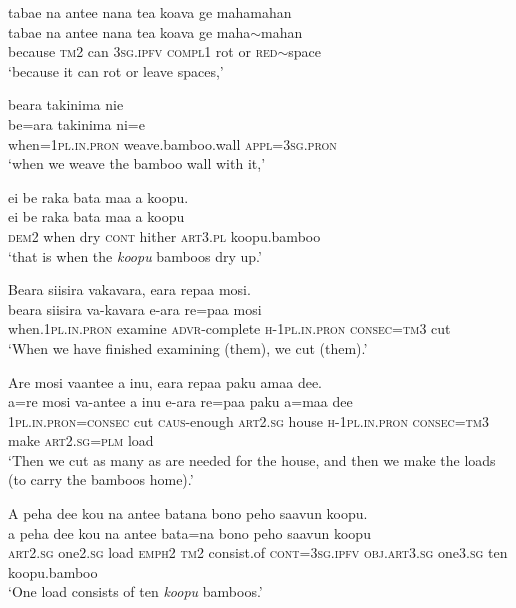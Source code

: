 \ea\label{ex:text14-11}
tabae na antee nana tea koava ge mahamahan\\
\gll tabae	na	antee	nana	tea	koava	ge	maha{$\sim$}mahan\\
     because	\textsc{tm}2	can	3\textsc{sg}.\textsc{ipfv}	\textsc{compl}1	rot	or	\textsc{red}{$\sim$}space\\
\glt `because it can rot or leave spaces,'
\z

\ea\label{ex:text14-12}
beara takinima nie\\
\gll be=ara	takinima	ni=e\\
     when=1\textsc{pl}.\textsc{in}.\textsc{pron}	weave.bamboo.wall	\textsc{appl}=3\textsc{sg}.\textsc{pron}\\
\glt `when we weave the bamboo wall with it,'
\z

\ea\label{ex:text14-13}
ei be raka bata maa a koopu.\\
\gll ei	be	raka	bata	maa	a	koopu\\
     \textsc{dem}2	when	dry	\textsc{cont}	hither	\textsc{art}3.\textsc{pl}	koopu.bamboo\\
\glt `that is when the \textit{koopu} bamboos dry up.'
\z

\ea\label{ex:text14-14}
Beara siisira vakavara, eara repaa mosi.\\
\gll beara	siisira	va-kavara	e-ara	re=paa	mosi\\
     when.1\textsc{pl}.\textsc{in}.\textsc{pron}	examine	\textsc{advr}-complete	\textsc{h}-1\textsc{pl}.\textsc{in}.\textsc{pron}	\textsc{consec}=\textsc{tm}3	cut\\
\glt `When we have finished examining (them), we cut (them).'
\z

\ea\label{ex:text14-15}
Are mosi vaantee a inu, eara repaa paku amaa dee.\\
\gll a=re	mosi	va-antee	a	inu	e-ara	re=paa	paku	a=maa	dee\\
     1\textsc{pl}.\textsc{in}.\textsc{pron}=\textsc{consec}	cut	\textsc{caus}-enough	\textsc{art}2.\textsc{sg}	house	\textsc{h}-1\textsc{pl}.\textsc{in}.\textsc{pron}	\textsc{consec}=\textsc{tm}3	make	\textsc{art}2.\textsc{sg}=\textsc{plm}	load\\
\glt `Then we cut as many as are needed for the house, and then we make the loads (to carry the bamboos home).'
\z

\ea\label{ex:text14-16}
A peha dee kou na antee batana bono peho saavun koopu.\\
\gll a	peha	dee	kou	na	antee	bata=na	bono	peho	saavun	koopu\\
     \textsc{art}2.\textsc{sg}	one2.\textsc{sg}	load	\textsc{emph}2	\textsc{tm}2	consist.of	\textsc{cont}=3\textsc{sg}.\textsc{ipfv}	\textsc{obj}.\textsc{art}3.\textsc{sg}	one3.\textsc{sg}	ten	koopu.bamboo\\
\glt `One load consists of ten \textit{koopu} bamboos.'
\z

